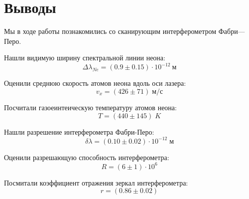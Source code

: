 \documentclass[11pt]{article}
\begin{document}
\section{Выводы}

  \par Мы в ходе работы познакомились со сканирующим интерферометром Фабри—Перо.
  \medskip
  \par Нашли видимую ширину спектральной линии неона:
  \[ \Delta\lambda_{Ne} = \left( 0.9 \pm 0.15  \right)\cdot 10^{-12}\: м \]
  \par  Оценили среднюю скорость атомов неона вдоль оси лазера:
  \[ v_x = \left( 426 \pm 71 \right)\; м/с \]
  \par  Посчитали газоеинтеическую температуру атомов неона:
  \[ T = \left(440 \pm 145 \right)\;K \]
  \par  Нашли разрешение интерферометра Фабри-Перо:
  \[ \delta\lambda = \left(0.10 \pm 0.02\right)\cdot 10^{-12}\;м \]
  \par  Оценили разрешающую способность интерферометра:
  \[ R = \left(6 \pm 1 \right)\cdot 10^6 \]
  \par  Посмитали коэффициент отражения зеркал интерферометра:
  \[ r = \left(0.86 \pm 0.02 \right) \]
\end{document}
